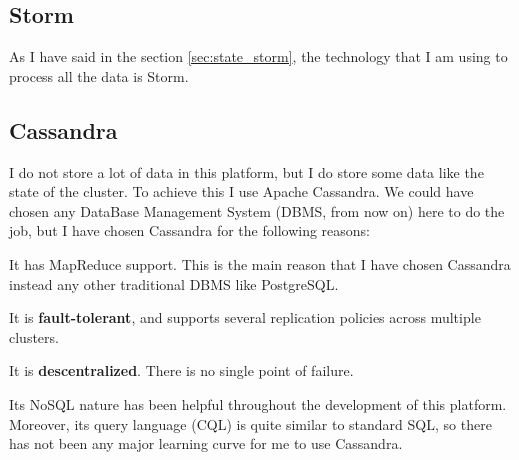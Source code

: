 \subsection{Storm}

As I have said in the section \ref{sec:state_storm}, the technology that I am
using to process all the data is Storm.

\subsection{Cassandra}
\label{sec:cassandra}

I do not store a lot of data in this platform, but I do store some data like
the state of the cluster. To achieve this I use Apache Cassandra. We could
have chosen any DataBase Management System (DBMS, from now on) here to do the
job, but I have chosen Cassandra for the following reasons:

\mylist
  \item It has MapReduce support. This is the main reason that I have chosen
Cassandra instead any other traditional DBMS like PostgreSQL.
  \item It is {\bf fault-tolerant}, and supports several replication policies
across multiple clusters.
  \item It is {\bf descentralized}. There is no single point of failure.
  \item Its NoSQL nature has been helpful throughout the development of this
platform. Moreover, its query language (CQL) is quite similar to standard SQL,
so there has not been any major learning curve for me to use Cassandra.
\mylistend
